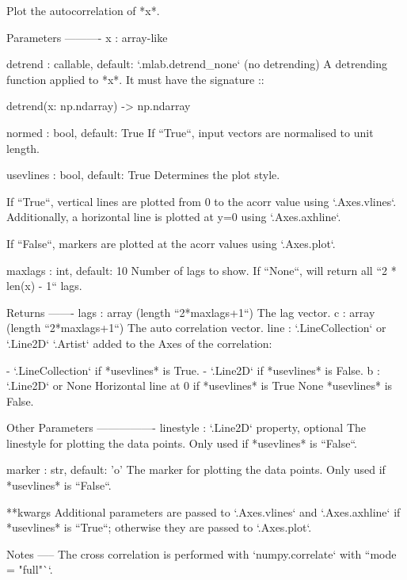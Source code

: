\begin{DoxyVerb}Plot the autocorrelation of *x*.

Parameters
----------
x : array-like

detrend : callable, default: `.mlab.detrend_none` (no detrending)
    A detrending function applied to *x*.  It must have the
    signature ::

detrend(x: np.ndarray) -> np.ndarray

normed : bool, default: True
    If ``True``, input vectors are normalised to unit length.

usevlines : bool, default: True
    Determines the plot style.

    If ``True``, vertical lines are plotted from 0 to the acorr value
    using `.Axes.vlines`. Additionally, a horizontal line is plotted
    at y=0 using `.Axes.axhline`.

    If ``False``, markers are plotted at the acorr values using
    `.Axes.plot`.

maxlags : int, default: 10
    Number of lags to show. If ``None``, will return all
    ``2 * len(x) - 1`` lags.

Returns
-------
lags : array (length ``2*maxlags+1``)
    The lag vector.
c : array  (length ``2*maxlags+1``)
    The auto correlation vector.
line : `.LineCollection` or `.Line2D`
    `.Artist` added to the Axes of the correlation:

    - `.LineCollection` if *usevlines* is True.
    - `.Line2D` if *usevlines* is False.
b : `.Line2D` or None
    Horizontal line at 0 if *usevlines* is True
    None *usevlines* is False.

Other Parameters
----------------
linestyle : `.Line2D` property, optional
    The linestyle for plotting the data points.
    Only used if *usevlines* is ``False``.

marker : str, default: 'o'
    The marker for plotting the data points.
    Only used if *usevlines* is ``False``.

**kwargs
    Additional parameters are passed to `.Axes.vlines` and
    `.Axes.axhline` if *usevlines* is ``True``; otherwise they are
    passed to `.Axes.plot`.

Notes
-----
The cross correlation is performed with `numpy.correlate` with
``mode = "full"``.
\end{DoxyVerb}
 \mbox{\label{classmatplotlib_1_1axes_1_1__axes_1_1Axes_a04ae4afb3fecfd6ad99e0d814c28a985}} 

